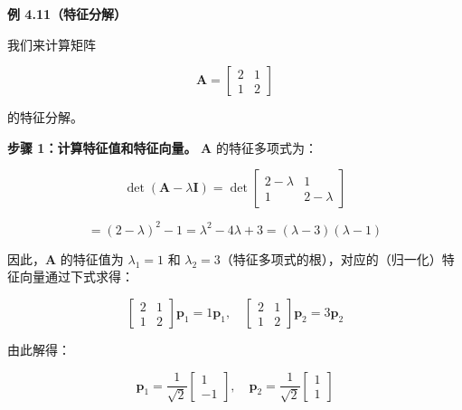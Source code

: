 \begin{notebox}
\textbf{例 4.11（特征分解）}
\end{notebox}

\begin{notebox}
我们来计算矩阵

\begin{equation*}
\boldsymbol{A} = \begin{bmatrix} 2 & 1 \\ 1 & 2 \end{bmatrix}
\end{equation*}

的特征分解。
\end{notebox}

\begin{notebox}
\textbf{步骤 1：计算特征值和特征向量。} $ \boldsymbol{A} $ 的特征多项式为：

\begin{equation}
\det(\boldsymbol{A} - \lambda \boldsymbol{I}) = \det\begin{bmatrix} 2 - \lambda & 1 \\ 1 & 2 - \lambda \end{bmatrix}
\tag{4.56a}\label{eq:4-56a}
\end{equation}

\begin{equation}
= (2 - \lambda)^2 - 1 = \lambda^2 - 4\lambda + 3 = (\lambda - 3)(\lambda - 1)
\tag{4.56b}\label{eq:4-56b}
\end{equation}

因此，$ \boldsymbol{A} $ 的特征值为 $ \lambda_1 = 1 $ 和 $ \lambda_2 = 3 $（特征多项式的根），对应的（归一化）特征向量通过下式求得：

\begin{equation}
\begin{bmatrix} 2 & 1 \\ 1 & 2 \end{bmatrix} \boldsymbol{p}_1 = 1 \boldsymbol{p}_1, \quad \begin{bmatrix} 2 & 1 \\ 1 & 2 \end{bmatrix} \boldsymbol{p}_2 = 3 \boldsymbol{p}_2
\tag{4.57}\label{eq:4-57}
\end{equation}

由此解得：

\begin{equation}
\boldsymbol{p}_1 = \frac{1}{\sqrt{2}} \begin{bmatrix} 1 \\ -1 \end{bmatrix}, \quad \boldsymbol{p}_2 = \frac{1}{\sqrt{2}} \begin{bmatrix} 1 \\ 1 \end{bmatrix}
\tag{4.58}\label{eq:4-58}
\end{equation}
\end{notebox}

